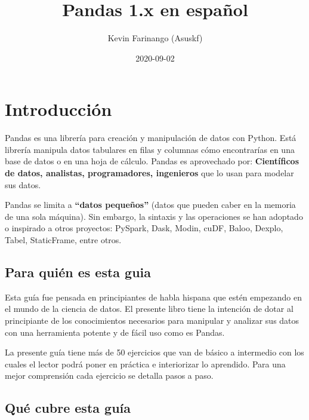 \documentclass[
]{book}
\title{Pandas 1.x en español}
\author{Kevin Farinango (Asuskf)}
\date{2020-09-02}
\begin{document}
\maketitle

{
\setcounter{tocdepth}{1}
\tableofcontents
}
\hypertarget{introducciuxf3n}{%
\chapter{Introducción}\label{introducciuxf3n}}

Pandas es una librería para creación y manipulación de datos con Python. Está librería manipula datos tabulares en filas y columnas cómo encontrarías en una base de datos o en una hoja de cálculo. Pandas es aprovechado por: \textbf{Científicos de datos, analistas, programadores, ingenieros} que lo usan para modelar sus datos.

Pandas se limita a \textbf{``datos pequeños''} (datos que pueden caber en la memoria de una sola máquina). Sin embargo, la sintaxis y las operaciones se han adoptado o inspirado a otros proyectos: PySpark, Dask, Modin, cuDF, Baloo, Dexplo, Tabel, StaticFrame, entre otros.

\hypertarget{para-quiuxe9n-es-esta-guia}{%
\section{Para quién es esta guia}\label{para-quiuxe9n-es-esta-guia}}

Esta guía fue pensada en principiantes de habla hispana que estén empezando en el mundo de la ciencia de datos. El presente libro tiene la intención de dotar al principiante de los conocimientos necesarios para manipular y analizar sus datos con una herramienta potente y de fácil uso como es Pandas.

La presente guía tiene más de 50 ejercicios que van de básico a intermedio con los cuales el lector podrá poner en práctica e interiorizar lo aprendido. Para una mejor comprensión cada ejercicio se detalla pasos a paso.

\hypertarget{quuxe9-cubre-esta-guuxeda}{%
\section{Qué cubre esta guía}\label{quuxe9-cubre-esta-guuxeda}}
\end{document}
